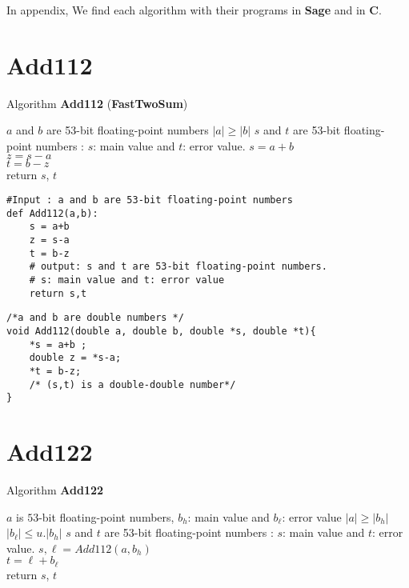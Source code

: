 In appendix,
We find each algorithm with their programs in \textbf{Sage} and in \textbf{C}.


\section*{Add112}

\begin{algorithm}[htbp]
  \caption{Algorithm \textbf{Add112} (\textbf{FastTwoSum})}
\begin{algorithmic}[1]
\Input $a$ and $b$ are 53-bit floating-point numbers
\Condition $\lvert a \rvert \ge \lvert b \rvert $
\Output $s$ and $t$ are 53-bit floating-point numbers : $s$: main value and $t$: error value.
\State $s = a+b$\\ 
    $z = s-a$\\ 
    $t = b-z$\\ 
    return $s$, $t$
\end{algorithmic}
\label{algo:Add112}
\end{algorithm}

\begin{lstlisting}
#Input : a and b are 53-bit floating-point numbers
def Add112(a,b):
    s = a+b 
    z = s-a 
    t = b-z 
    # output: s and t are 53-bit floating-point numbers.
    # s: main value and t: error value
    return s,t
\end{lstlisting}

\begin{lstlisting}
/*a and b are double numbers */
void Add112(double a, double b, double *s, double *t){
    *s = a+b ;
    double z = *s-a;
    *t = b-z;
    /* (s,t) is a double-double number*/
}
\end{lstlisting}
\newpage

\section*{Add122}
\begin{algorithm}[htbp]
  \caption{Algorithm \textbf{Add122}}
\begin{algorithmic}[1]
\Input $a$ is $53$-bit floating-point numbers, $b_h$: main value and  $b_{\ell}$: error value
\Condition $\lvert a \rvert \ge \lvert b_h \rvert $
\Condition $\lvert b_{\ell} \rvert \le u. \lvert b_h \rvert$ 
\Output  $s$ and $t$ are 53-bit floating-point numbers : $s$: main value and $t$: error value.
\State $s,\ell = Add112(a,b_h)$\\
    $t = \ell +b_{\ell}$\\
    return $s$, $t$
\end{algorithmic}
\label{algo:Add122}
\end{algorithm}


